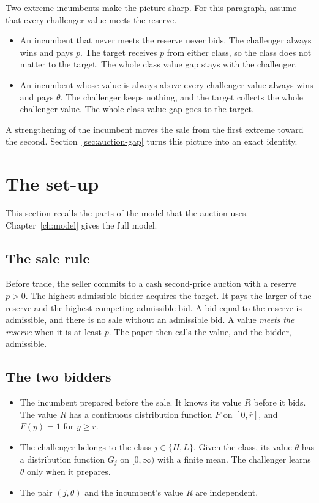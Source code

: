 Two extreme incumbents make the picture sharp. For this paragraph, assume that every challenger value meets the
reserve.
\begin{itemize}
\item An incumbent that never meets the reserve never bids. The challenger always wins and pays \(p\). The target
receives \(p\) from either class, so the class does not matter to the target. The whole class value gap stays
with the challenger.
\item An incumbent whose value is always above every challenger value always wins and pays \(\theta\). The
challenger keeps nothing, and the target collects the whole challenger value. The whole class value gap goes to
the target.
\end{itemize}
A strengthening of the incumbent moves the sale from the first extreme toward the second.
Section~\ref{sec:auction-gap} turns this picture into an exact identity.

\section{The set-up}\label{sec:auction-setup}

This section recalls the parts of the model that the auction uses. Chapter~\ref{ch:model} gives the full model.

\subsection*{The sale rule}

Before trade, the seller commits to a cash second-price auction with a reserve \(p>0\). The highest admissible
bidder acquires the target. It pays the larger of the reserve and the highest competing admissible bid. A bid
equal to the reserve is admissible, and there is no sale without an admissible bid. A value \emph{meets the
reserve} when it is at least \(p\). The paper then calls the value, and the bidder, admissible.

\subsection*{The two bidders}

\begin{itemize}
\item The incumbent prepared before the sale. It knows its value \(R\) before it bids. The value \(R\) has a
continuous distribution function \(F\) on \([0,\bar r]\), and \(F(y)=1\) for \(y\ge\bar r\).
\item The challenger belongs to the class \(j\in\{H,L\}\). Given the class, its value \(\theta\) has a
distribution function \(G_j\) on \([0,\infty)\) with a finite mean. The challenger learns \(\theta\) only when it
prepares.
\item The pair \((j,\theta)\) and the incumbent's value \(R\) are independent.
\end{itemize}

